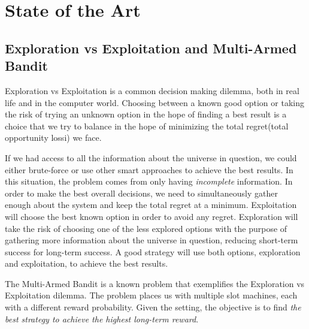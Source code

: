 \section{State of the Art}

\subsection{Exploration vs Exploitation and Multi-Armed Bandit} \label{sec:sota_mab}
Exploration vs Exploitation is a common decision making dilemma, both in real life
and in the computer world. Choosing between a known good option or taking the risk
of trying an unknown option in the hope of finding a best result is a choice that
we try to balance in the hope of minimizing the total regret(total opportunity
lossi\cite{kn:Silver}) we face.

If we had access to all the information about the universe in question, we could
either brute-force or use other smart approaches to achieve the best results. In
this situation, the problem comes from only having \textit{incomplete}
information. In order to make the best overall decisions, we need to
simultaneously gather enough about the system and keep the total regret at a
minimum. Exploitation will choose the best known option in order to avoid any
regret. Exploration will take the risk of choosing one of the less explored
options with the purpose of gathering more information about the universe in
question, reducing short-term success for long-term success. A good strategy will
use both options, exploration and exploitation, to achieve the best results.

The Multi-Armed Bandit is a known problem that exemplifies the Exploration vs
Exploitation dilemma. The problem places us with multiple slot machines, each with
a different reward probability. Given the setting, the objective is to find
\textit{the best strategy to achieve the highest long-term reward}\cite{kn:Weng2018}.
